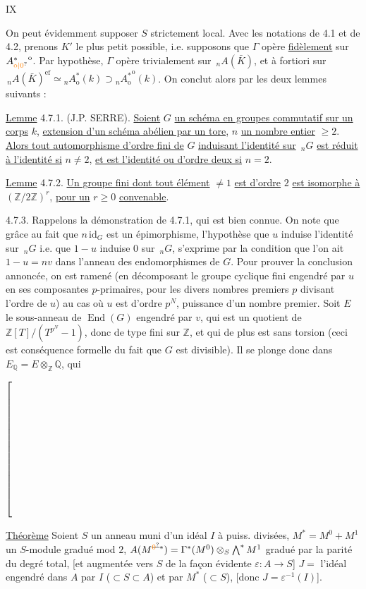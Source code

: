 \hfill IX

On peut évidemment supposer $S$ strictement local. Avec les notations de 4.1 et de 4.2, prenons $K'$ le plus petit possible, i.e.
supposons que $\Gamma$ opère \uline{fidèlement} sur ${A^{*}_{\unsure{\mathrm o|0}}}^{\mathrm o}$. Par hypothèse, $\Gamma$ opère
trivialement sur $\,{}_nA(\bar K)$, et à fortiori sur $\,{}_nA(\bar K)^{\mathrm{ef}}\simeq{}_nA^*_{\mathrm o}(k)\supset{}_n{A_{\mathrm o}^{*}}^{\mathrm o}(k)$. On conclut alors par les deux lemmes suivants :

\uline{Lemme} 4.7.1. (J.P. SERRE). \uline{Soient} $G$ \uline{un schéma en groupes commutatif sur un corps} $k$, \uline{extension d'un schéma abélien par un tore}, $n$ \uline{un nombre entier} $\geq2$. \uline{Alors tout automorphisme d'ordre fini de} $G$ \uline{induisant l'identité sur} $\,{}_nG$ \uline{est réduit à l'identité si} $n\ne2$, \uline{et est l'identité ou d'ordre deux si} $n=2$.

\uline{Lemme} 4.7.2. \uline{Un groupe fini dont tout élément} $\ne1$ \uline{est d'ordre} $2$ \uline{est isomorphe à} $(\mathbb Z/2\mathbb Z)^r$, \uline{pour un} $r\geq0$ \uline{convenable}.

4.7.3. Rappelons la démonstration de 4.7.1, qui est bien connue. On note que grâce au fait que $n\,\mathrm{id}_G$ est un épimorphisme,
l'hypothèse que $u$ induise l'identité sur $\,{}_nG$ i.e. que $1-u$ induise $0$ sur $\,{}_nG$, s'exprime par la condition que l'on ait $1-u=nv$ dans l'anneau des endomorphismes de $G$.
Pour prouver la conclusion annoncée, on est ramené (en décomposant le groupe cyclique fini engendré par $u$ en ses composantes $p$-primaires, pour les divers nombres premiers $p$ divisant l'ordre de $u$)
au cas où $u$ est d'ordre $p^N$, puissance d'un nombre premier.
Soit $E$ le sous-anneau de $\operatorname{End}(G)$
engendré par $v$, qui est un quotient de $\mathbb Z[T]/(T^{p^N}-1)$, donc de type fini sur $\mathbb Z$, et qui de plus est sans torsion (ceci est conséquence formelle du fait que $G$ est divisible).
Il se plonge donc dans $E_{\mathbb Q}=E\otimes_{\mathbb Z}\mathbb Q$, qui

\noindent$\left[\vphantom{\rule{0pt}{6\baselineskip}}\right.$\begin{minipage}{.90\linewidth}
\uline{Théorème} Soient $S$ un anneau muni d'un idéal $I$ à puiss. divisées, $M^\ast=M^0+M^1$ un $S$-module gradué mod $2$,
$A(M^{\deleted{\unsure{0}}\ast})=\Gamma^\ast(M^0)\otimes_S\bigwedge^\ast M^1$  gradué par la parité du degré total, [et augmentée vers $S$ de la façon évidente $\varepsilon:A\longrightarrow S$]
$J=$ l'idéal engendré dans $A$ par $I$ ($\subset S\subset A$) et par $M^\ast$ ($\subset S$), [donc $J=\varepsilon^{-1}(I)$].
\end{minipage}

